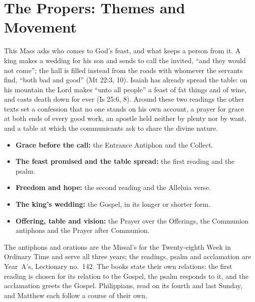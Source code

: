 
\section{The Propers: Themes and Movement}

This Mass asks who comes to God's feast, and what keeps a person from it. A
king makes a wedding for his son and sends to call the invited, ``and they
would not come''; the hall is filled instead from the roads with whomever the
servants find, ``both bad and good'' (Mt 22:3, 10). Isaiah has already spread
the table: on his mountain the Lord makes ``unto all people'' a feast of fat
things and of wine, and casts death down for ever (Is 25:6, 8). Around these
two readings the other texts set a confession that no one stands on his own
account, a prayer for grace at both ends of every good work, an apostle held
neither by plenty nor by want, and a table at which the communicants ask to
share the divine nature.

\begin{itemize}[leftmargin=1.2em,itemsep=0pt,topsep=.3em]
\item \textbf{Grace before the call:} the Entrance Antiphon and the Collect.
\item \textbf{The feast promised and the table spread:} the first reading and
the psalm.
\item \textbf{Freedom and hope:} the second reading and the Alleluia verse.
\item \textbf{The king's wedding:} the Gospel, in its longer or shorter form.
\item \textbf{Offering, table and vision:} the Prayer over the Offerings, the
Communion antiphons and the Prayer after Communion.
\end{itemize}

The antiphons and orations are the Missal's for the Twenty-eighth Week in
Ordinary Time and serve all three years; the readings, psalm and acclamation
are Year~A's, Lectionary no.~142. The books state their own relations: the
first reading is chosen for its relation to the Gospel, the psalm responds to
it, and the acclamation greets the Gospel. Philippians, read on its fourth and
last Sunday, and Matthew each follow a course of their own.


